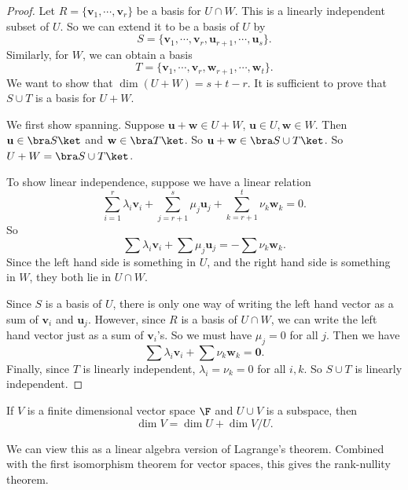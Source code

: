 \documentclass[a4paper]{article}
\begin{document}
\begin{proof}
  Let $R = \{\mathbf{v}_1, \cdots, \mathbf{v}_r\}$ be a basis for $U\cap W$. This is a linearly independent subset of $U$. So we can extend it to be a basis of $U$ by
  \[
    S = \{\mathbf{v}_1, \cdots, \mathbf{v}_r, \mathbf{u}_{r + 1}, \cdots, \mathbf{u}_s\}.
  \]
  Similarly, for $W$, we can obtain a basis
  \[
    T = \{\mathbf{v}_1, \cdots, \mathbf{v}_r, \mathbf{w}_{r + 1}, \cdots, \mathbf{w}_t\}.
  \]
  We want to show that $\dim (U + W) = s + t - r$. It is sufficient to prove that $S\cup T$ is a basis for $U + W$.

  We first show spanning. Suppose $\mathbf{u} + \mathbf{w} \in U + W$, $\mathbf{u}\in U, \mathbf{w}\in W$. Then $\mathbf{u}\in \bra S\ket$ and $\mathbf{w}\in \bra T\ket$. So $\mathbf{u} + \mathbf{w} \in \bra S\cup T\ket$. So $U + W = \bra S \cup T\ket$.

  To show linear independence, suppose we have a linear relation
  \[
    \sum_{i = 1}^r \lambda_i \mathbf{v}_i + \sum_{j = r + 1}^s \mu_j \mathbf{u}_j + \sum_{k = r + 1}^t \nu_k \mathbf{w}_k = 0.
  \]
  So
  \[
    \sum \lambda_i \mathbf{v}_i + \sum \mu_j \mathbf{u}_j = - \sum \nu_k \mathbf{w}_k.
  \]
  Since the left hand side is something in $U$, and the right hand side is something in $W$, they both lie in $U\cap W$.

  Since $S$ is a basis of $U$, there is only one way of writing the left hand vector as a sum of $\mathbf{v}_i$ and $\mathbf{u}_j$. However, since $R$ is a basis of $U\cap W$, we can write the left hand vector just as a sum of $\mathbf{v}_i$'s. So we must have $\mu_j = 0$ for all $j$. Then we have
  \[
    \sum \lambda_i \mathbf{v}_i + \sum \nu_k \mathbf{w}_k = \mathbf{0}.
  \]
  Finally, since $T$ is linearly independent, $\lambda_i = \nu_k = 0$ for all $i, k$. So $S\cup T$ is linearly independent.
\end{proof}

\begin{prop}
  If $V$ is a finite dimensional vector space $\F$ and $U\cup V$ is a subspace, then
  \[
    \dim V = \dim U + \dim V/U.
  \]
\end{prop}
We can view this as a linear algebra version of Lagrange's theorem. Combined with the first isomorphism theorem for vector spaces, this gives the rank-nullity theorem.
\end{document}
